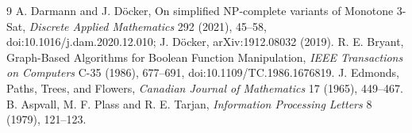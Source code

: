 \documentclass[11pt]{article}
\begin{document}
\begin{thebibliography}{9}
 A. Darmann and J. D\"ocker, On simplified NP-complete variants of Monotone 3-Sat, \emph{Discrete Applied Mathematics} 292 (2021), 45--58, doi:10.1016/j.dam.2020.12.010; J. D\"ocker, arXiv:1912.08032 (2019).
 R. E. Bryant, Graph-Based Algorithms for Boolean Function Manipulation, \emph{IEEE Transactions on Computers} C-35 (1986), 677--691, doi:10.1109/TC.1986.1676819.
 J. Edmonds, Paths, Trees, and Flowers, \emph{Canadian Journal of Mathematics} 17 (1965), 449--467.
 B. Aspvall, M. F. Plass and R. E. Tarjan, \emph{Information Processing Letters} 8 (1979), 121--123.
\end{thebibliography}
\end{document}
